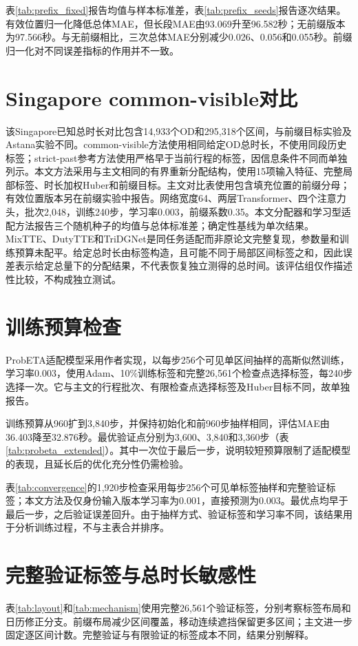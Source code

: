 \documentclass[journal]{IEEEtran}
\begin{document}
表\ref{tab:prefix_fixed}报告均值与样本标准差，表\ref{tab:prefix_seeds}报告逐次结果。有效位置归一化降低总体MAE，但长段MAE由93.069升至96.582秒；无前缀版本为97.566秒。与无前缀相比，三次总体MAE分别减少0.026、0.056和0.055秒。前缀归一化对不同误差指标的作用并不一致。

\section{Singapore common-visible对比}\label{sec:singapore-common-visible}
该Singapore已知总时长对比包含14,933个OD和295,318个区间，与前缀目标实验及Astana实验不同。common-visible方法使用相同给定OD总时长，不使用同段历史标签；strict-past参考方法使用严格早于当前行程的标签，因信息条件不同而单独列示。本文方法采用与主文相同的有界重新分配结构，使用15项输入特征、完整局部标签、时长加权Huber和前缀目标。主文对比表使用包含填充位置的前缀分母；有效位置版本另在前缀实验中报告。网络宽度64、两层Transformer、四个注意力头，批次2,048，训练240步，学习率0.003，前缀系数0.35。本文分配器和学习型适配方法报告三个随机种子的均值与总体标准差；确定性基线为单次结果。MixTTE、DutyTTE和TriDGNet\cite{jiang2026mixtte,mao2025dutytte,zuo2026tridgnet}是同任务适配而非原论文完整复现，参数量和训练预算未配平。给定总时长由标签构造，且可能不同于局部区间标签之和，因此误差表示给定总量下的分配结果，不代表恢复独立测得的总时间。该评估组仅作描述性比较，不构成独立测试。

\section{训练预算检查}

ProbETA适配模型采用作者实现\cite{xu2025probeta}，以每步256个可见单区间抽样的高斯似然训练，学习率0.003，使用Adam、10\%训练标签和完整26,561个检查点选择标签，每240步选择一次。它与主文的行程批次、有限检查点选择标签及Huber目标不同，故单独报告。

训练预算从960扩到3,840步，并保持初始化和前960步抽样相同，评估MAE由36.403降至32.876秒。最优验证点分别为3,600、3,840和3,360步（表\ref{tab:probeta_extended}）。其中一次位于最后一步，说明较短预算限制了适配模型的表现，且延长后的优化充分性仍需检验。


表\ref{tab:convergence}的1,920步检查采用每步256个可见单标签抽样和完整验证标签；本文方法及仅身份输入版本学习率为0.001，直接预测为0.003。最优点均早于最后一步，之后验证误差回升。由于抽样方式、验证标签和学习率不同，该结果用于分析训练过程，不与主表合并排序。

\section{完整验证标签与总时长敏感性}


表\ref{tab:layout}和\ref{tab:mechanism}使用完整26,561个验证标签，分别考察标签布局和日历修正分支。前缀布局减少区间覆盖，移动连续遮挡保留更多区间；主文进一步固定逐区间计数。完整验证与有限验证的标签成本不同，结果分别解释。
\end{document}
